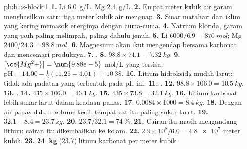 \begin{solution}{pb:b1:s-block:1}
\textbf{1.} Li \qty{6.0}{g/L}, Mg \qty{2.4}{g/L}.
\textbf{2.} Empat meter kubik air garam menghasilkan satu: tiga meter
kubik air menguap.
\textbf{3.} Sinar matahari dan iklim yang kering memasok energinya
dengan cuma-cuma.
\textbf{4.} Natrium klorida, garam yang jauh paling melimpah, paling
dahulu jenuh.
\textbf{5.} Li $6000/6.9 = \qty{870}{mol}$; Mg $2400/24.3 = \qty{98.8}{mol}$.
\textbf{6.} Magnesium akan ikut mengendap bersama karbonat dan mencemari
produknya.
\textbf{7.} .
\textbf{8.} $98.8 \times 74.1 = \qty{7.32}{kg}$.
\textbf{9.} $[\ce{Mg^2+}] = \num{9.88e-5}$ mol/L yang tersisa: $\mathrm{pH} = 14.00 -
\frac12(11.25 - 4.01) = 10.38$.
\textbf{10.} Litium hidroksida mudah larut: tidak ada padatan yang
terbentuk pada pH ini.
\textbf{11.} .
\textbf{12.} $98.8 \times 106.0 = \qty{10.5}{kg}$.
\textbf{13.} .
\textbf{14.} $435 \times 106.0 = \qty{46.1}{kg}$.
\textbf{15.} $435 \times 73.8 = \qty{32.1}{kg}$.
\textbf{16.} Litium karbonat lebih sukar larut dalam keadaan panas.
\textbf{17.} $0.0084 \times 1000 = \qty{8.4}{kg}$.
\textbf{18.} Dengan air panas dalam volume kecil, tempat zat itu paling
sukar larut.
\textbf{19.} $32.1 - 8.4 = \qty{23.7}{kg}$.
\textbf{20.} $23.7/32.1 = \qty{74}{\percent}$.
\textbf{21.} Cairan itu masih mengandung litium: cairan itu dikembalikan
ke kolam.
\textbf{22.} $2.9 \times 10^8/6.0 = \num{4.8e7}$ meter kubik.
\textbf{23.} \textbf{\qty{24}{kg}} (23.7) litium karbonat per meter
kubik.
\end{solution}
